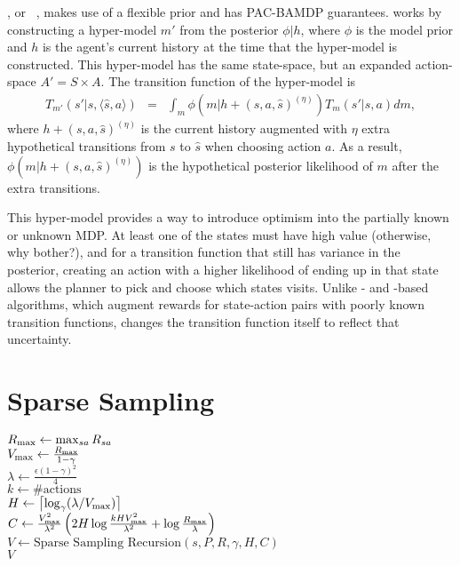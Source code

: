 , or ~\cite{araya2012near}, makes use of a flexible prior and has PAC-BAMDP guarantees.  works by constructing a hyper-model $m'$ from the posterior $\phi|h$, where $\phi$ is the model prior and $h$ is the agent's current history at the time that the hyper-model is constructed. This hyper-model has the same state-space, but an expanded action-space $A' = S \times A$. The transition function of the hyper-model is
\begin{eqnarray}
T_{m'}(s'|s, \langle \hat s, a \rangle) &=& \int_m \phi(m|h+(s,a,\hat s)^{(\eta)})T_m(s'|s,a) d m,
\end{eqnarray}
where $h+(s,a,\hat s)^{(\eta)}$ is the current history augmented with $\eta$ extra hypothetical transitions from $s$ to $\hat s$ when choosing action $a$. As a result, $\phi(m|h+(s,a,\hat s)^{(\eta)})$ is the hypothetical posterior likelihood of $m$ after the extra transitions.

This hyper-model provides a way to introduce optimism into the partially known or unknown MDP. At least one of the states must have high value (otherwise, why bother?), and for a transition function that still has variance in the posterior, creating an action with a higher likelihood of ending up in that state allows the planner to pick and choose which states visits. Unlike - and -based algorithms, which augment rewards for state-action pairs with poorly known transition functions,  changes the transition function itself to reflect that uncertainty.



\section{Sparse Sampling}

\label{sec:rel:ss}

\begin{algorithm}[tb]
	\caption{$\mbox{Sparse~Sampling}(s, P, R, \gamma, \epsilon, \delta)$}
	\label{alg:ss}
	$R_{\rm max} \leftarrow \max_{sa}R_{sa}$\\
	$V_{\rm max} \leftarrow \frac{R_{\rm max}}{1-\gamma}$\\
	$\lambda \leftarrow \frac{\epsilon(1-\gamma)^2} 4$\\
	$k \leftarrow \#\mbox{actions}$\\
	$H \leftarrow \left\lceil\log_\gamma(\lambda/V_{\rm max})\right\rceil$\\
	$C \leftarrow \frac {V_{\rm max}^2}{\lambda^2}\left(2H\log\frac{kHV_{\rm max}^2}{\lambda^2}+\log\frac{R_{\rm max}}{\lambda}\right)$\\
	$V \leftarrow \mbox{Sparse~Sampling~Recursion}(s, P, R, \gamma, H, C)$\\
	\Return $V$
\end{algorithm}

